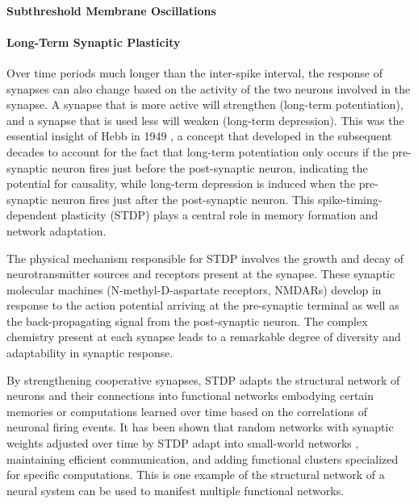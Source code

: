 \documentclass[twocolumn]{article}
\begin{document}
\paragraph{\label{sec:subthreshold_membrane_oscillations}Subthreshold Membrane Oscillations}

\paragraph{\label{sec:long_term_plasticity}Long-Term Synaptic Plasticity}
Over time periods much longer than the inter-spike interval, the response of synapses can also change based on the activity of the two neurons involved in the synapse. A synapse that is more active will strengthen (long-term potentiation), and a synapse that is used less will weaken (long-term depression). This was the essential insight of Hebb in 1949 \cite{he1949}, a concept that developed in the subsequent decades \cite{bipo1998,somi2000} to account for the fact that long-term potentiation only occurs if the pre-synaptic neuron fires just before the post-synaptic neuron, indicating the potential for causality, while long-term depression is induced when the pre-synaptic neuron fires just after the post-synaptic neuron. This spike-timing-dependent plasticity (STDP) \cite{mage2012} plays a central role in memory formation and network adaptation. 

The physical mechanism responsible for STDP involves the growth and decay of neurotransmitter sources and receptors present at the synapse. These synaptic molecular machines (N-methyl-D-aspartate receptors, NMDARs) develop in response to the action potential arriving at the pre-synaptic terminal as well as the back-propagating signal from the post-synaptic neuron. The complex chemistry present at each synapse leads to a remarkable degree of diversity and adaptability in synaptic response.

By strengthening cooperative synapses, STDP adapts the structural network of neurons and their connections into functional networks embodying certain memories or computations learned over time based on the correlations of neuronal firing events. It has been shown that random networks with synaptic weights adjusted over time by STDP adapt into small-world networks \cite{shki2006}, maintaining efficient communication, and adding functional clusters specialized for specific computations. This is one example of the structural network of a neural system can be used to manifest multiple functional networks.
\end{document}
